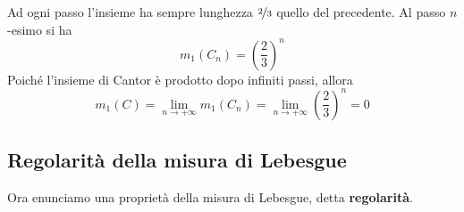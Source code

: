 Ad ogni passo l'insieme ha sempre lunghezza $\nicefrac{2}{3}$ quello del precedente. Al passo $n$-esimo si ha
\begin{equation*}
	m_1\left(C_n\right)=\left(\frac{2}{3}\right)^n
\end{equation*}
Poiché l'insieme di Cantor è prodotto dopo infiniti passi, allora
\begin{equation*}
	m_1\left(C\right)=\lim_{n\to+\infty}m_1\left(C_n\right)=\lim_{n\to+\infty}\left(\frac{2}{3}\right)^n=0
\end{equation*}
\subsection{Regolarità della misura di Lebesgue}
Ora enunciamo una proprietà della misura di Lebesgue, detta \textbf{regolarità}.
